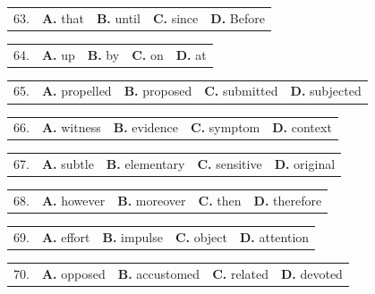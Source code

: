 \documentclass[UTF8,11pt]{ctexart}
\begin{document}
\noindent\begin{tabularx}{\linewidth}{@{}lXXXX@{}}63. & \textbf{A.} that & \textbf{B.} until & \textbf{C.} since & \textbf{D.} Before\\\end{tabularx}\par

\noindent\begin{tabularx}{\linewidth}{@{}lXXXX@{}}64. & \textbf{A.} up & \textbf{B.} by & \textbf{C.} on & \textbf{D.} at\\\end{tabularx}\par

\noindent\begin{tabularx}{\linewidth}{@{}lXXXX@{}}65. & \textbf{A.} propelled & \textbf{B.} proposed & \textbf{C.} submitted & \textbf{D.} subjected\\\end{tabularx}\par

\noindent\begin{tabularx}{\linewidth}{@{}lXXXX@{}}66. & \textbf{A.} witness & \textbf{B.} evidence & \textbf{C.} symptom & \textbf{D.} context\\\end{tabularx}\par

\noindent\begin{tabularx}{\linewidth}{@{}lXXXX@{}}67. & \textbf{A.} subtle & \textbf{B.} elementary & \textbf{C.} sensitive & \textbf{D.} original\\\end{tabularx}\par

\noindent\begin{tabularx}{\linewidth}{@{}lXXXX@{}}68. & \textbf{A.} however & \textbf{B.} moreover & \textbf{C.} then & \textbf{D.} therefore\\\end{tabularx}\par

\noindent\begin{tabularx}{\linewidth}{@{}lXXXX@{}}69. & \textbf{A.} effort & \textbf{B.} impulse & \textbf{C.} object & \textbf{D.} attention\\\end{tabularx}\par

\noindent\begin{tabularx}{\linewidth}{@{}lXXXX@{}}70. & \textbf{A.} opposed & \textbf{B.} accustomed & \textbf{C.} related & \textbf{D.} devoted\\\end{tabularx}\par
\end{document}
